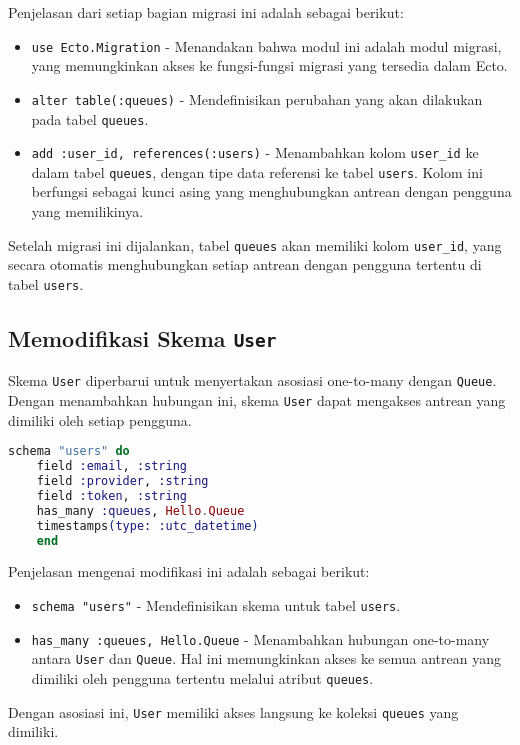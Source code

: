 Penjelasan dari setiap bagian migrasi ini adalah sebagai berikut:
\begin{itemize}
	\item \texttt{use Ecto.Migration} - Menandakan bahwa modul ini adalah modul migrasi, yang memungkinkan akses ke fungsi-fungsi migrasi yang tersedia dalam Ecto.
	\item \texttt{alter table(:queues)} - Mendefinisikan perubahan yang akan dilakukan pada tabel \texttt{queues}. 
	\item \texttt{add :user\_id, references(:users)} - Menambahkan kolom \texttt{user\_id} ke dalam tabel \texttt{queues}, dengan tipe data referensi ke tabel \texttt{users}. Kolom ini berfungsi sebagai kunci asing yang menghubungkan antrean dengan pengguna yang memilikinya.
\end{itemize}

Setelah migrasi ini dijalankan, tabel \texttt{queues} akan memiliki kolom \texttt{user\_id}, yang secara otomatis menghubungkan setiap antrean dengan pengguna tertentu di tabel \texttt{users}.

\subsection{Memodifikasi Skema \texttt{User}}
Skema \texttt{User} diperbarui untuk menyertakan asosiasi one-to-many dengan \texttt{Queue}. Dengan menambahkan hubungan ini, skema \texttt{User} dapat mengakses antrean yang dimiliki oleh setiap pengguna.

\begin{lstlisting}[language=Elixir, caption={\texttt{lib/hello/user.ex}}]
	schema "users" do
	field :email, :string
	field :provider, :string
	field :token, :string
	has_many :queues, Hello.Queue
	timestamps(type: :utc_datetime)
	end
\end{lstlisting}

Penjelasan mengenai modifikasi ini adalah sebagai berikut:
\begin{itemize}
	\item \texttt{schema "users"} - Mendefinisikan skema untuk tabel \texttt{users}.
	\item \texttt{has\_many :queues, Hello.Queue} - Menambahkan hubungan one-to-many antara \texttt{User} dan \texttt{Queue}. Hal ini memungkinkan akses ke semua antrean yang dimiliki oleh pengguna tertentu melalui atribut \texttt{queues}.
\end{itemize}

Dengan asosiasi ini, \texttt{User} memiliki akses langsung ke koleksi \texttt{queues} yang dimiliki.


